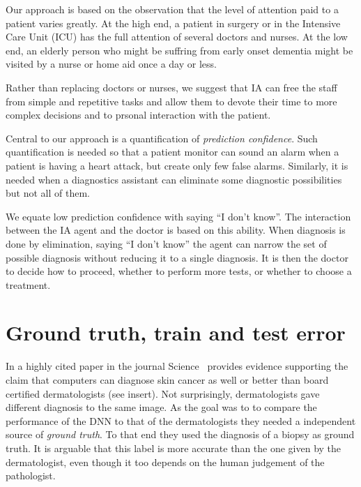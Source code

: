 \documentclass[11pt]{pnas-new}
\begin{document}
Our approach is based on the observation that the level of attention
paid to a patient varies greatly. At the high end, a patient in
surgery or in the Intensive Care Unit (ICU) has the full attention of
several doctors and nurses. At the low end, an elderly person who
might be suffring from early onset dementia might be visited by a
nurse or home aid once a day or less.

Rather than replacing doctors or nurses, we suggest that IA can free
the staff from simple and repetitive tasks and allow them to devote
their time to more complex decisions and to prsonal interaction with
the patient.

Central to our approach is a quantification of {\em prediction confidence}. Such
quantification is needed so that a patient monitor can sound an alarm
when a patient is having a heart attack, but create only few false
alarms. Similarly, it is needed when a diagnostics assistant can
eliminate some diagnostic possibilities but not all of them.

We equate low prediction confidence with saying ``I don't know''. The
interaction between the IA agent and the doctor is based on this
ability. When diagnosis is done by elimination, saying ``I don't
know'' the agent can narrow the set of possible diagnosis without
reducing it to a single diagnosis. It is then the doctor to decide how
to proceed, whether to perform more tests, or whether to choose a treatment.


\section{Ground truth, train and test error}
\label{sec:ground-truth}

In a highly cited paper in the journal
Science~\cite{esteva2017dermatologist} provides evidence supporting
the claim that computers can diagnose skin cancer as well or better than board
certified dermatologists (see insert).
Not surprisingly, dermatologists gave different diagnosis to the same image.  As
the goal was to to compare the performance of the DNN to that of the
dermatologists they needed a independent source of {\em ground truth}.
To that end they used the diagnosis of a biopsy as ground truth. It is
arguable that this label is more accurate than the one given by the
dermatologist, even though it too depends on the human judgement of the
pathologist.
\end{document}
